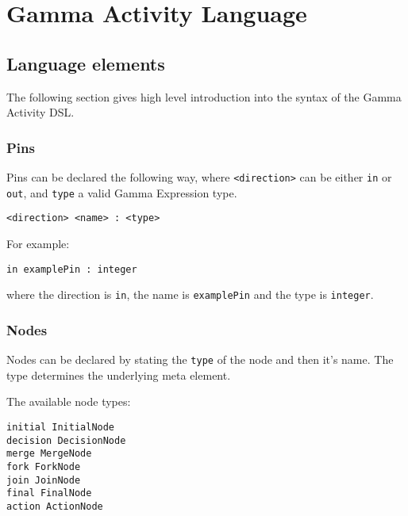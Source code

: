 \clearpage\section{Gamma Activity Language}\label{sec:gamma-activity-language-constructs}

\subsection{Language elements}

The following section gives high level introduction into the syntax of the Gamma Activity DSL.

\subsubsection{Pins}\label{sssec:pins}

Pins can be declared the following way, where \verb|<direction>| can be either \verb|in| or \verb|out|, and \verb|type| a valid Gamma Expression type.

\begin{lstlisting}[language=activity]
<direction> <name> : <type>
\end{lstlisting}

For example: 

\begin{lstlisting}[language=activity]
in examplePin : integer
\end{lstlisting}

where the direction is \verb|in|, the name is \verb|examplePin| and the type is \verb|integer|.

\subsubsection*{Nodes}\label{sssec:nodes}

Nodes can be declared by stating the \verb|type| of the node and then it's name. The type determines the underlying meta element.

The available node types:

\begin{lstlisting}[language=activity]
initial InitialNode
decision DecisionNode
merge MergeNode
fork ForkNode
join JoinNode
final FinalNode
action ActionNode
\end{lstlisting}

